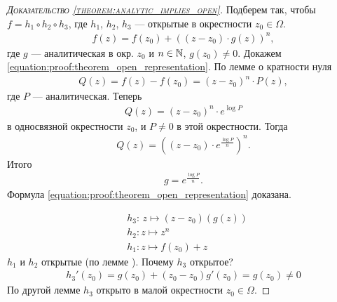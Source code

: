 \documentclass[../complex-analysis.tex]{subfiles}
\begin{document}
\begin{proof}[\normalfont\textsc{Доказательство \eqref{theorem:analytic_implies_open}}]
  Подберем так, чтобы $ f = h_1 \circ h_2 \circ h_3 $, где $ h_1 $, $ h_2 $, $ h_3 $ --- открытые в окрестности $ z_0 \in \Omega $.
 \begin{align}
  \label{equation:proof:theorem_open_representation}
  f(z) = f(z_0) + \left((z - z_0) \cdot g(z) \right)^{n},
 \end{align} где $ g $ --- аналитическая в окр. $ z_0 $ и $ n \in \mathbb{N} $, $ g(z_0) \neq 0 $. Докажем \eqref{equation:proof:theorem_open_representation}. По лемме о кратности нуля
 \begin{align*}
  Q(z) = f(z) - f(z_0) = (z - z_0)^{n} \cdot P(z),
 \end{align*} где $ P $ --- аналитическая. Теперь
 \begin{align*}
  Q(z) = (z - z_0)^{n} \cdot e^{\log P}
 \end{align*} в односвязной окрестности $ z_0 $, и $ P \neq 0 $ в этой окрестности. Тогда
 \begin{align*}
  Q(z) = \left((z-z_0) \cdot e^{\frac{\log P}{n}}\right)^{n}.
 \end{align*} Итого
 \begin{align*}
  g = e^{\frac{\log P}{n}}.
 \end{align*} Формула \eqref{equation:proof:theorem_open_representation} доказана.

 \begin{align*}
  &h_3 \colon\, z \mapsto (z-z_0)(g(z)) \\
  &h_2 \colon z \mapsto z^{n} \\
  &h_1 \colon z \mapsto f(z_0) + z
 \end{align*} $ h_1 $ и $ h_2 $ открытые (по лемме ). Почему $ h_3 $ открытое?
 \begin{align*}
  h_3'(z_0) = g(z_0) + (z_0 - z_0) g'(z_0) = g(z_0) \neq 0
 \end{align*} По другой лемме $ h_3 $ открыто в малой окрестности $ z_0 \in \Omega $.

\end{proof}
\end{document}
